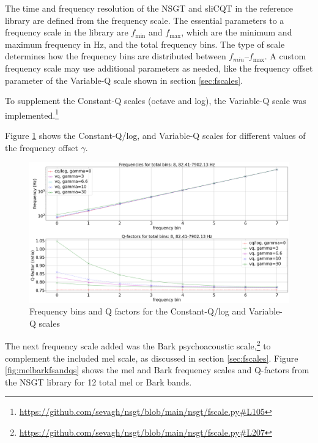 \documentclass[report.tex]{subfiles}
\begin{document}
The time and frequency resolution of the NSGT and sliCQT in the reference library are defined from the frequency scale. The essential parameters to a frequency scale in the library are $f_{\text{min}}$ and $f_{\text{max}}$, which are the minimum and maximum frequency in Hz, and the total frequency bins. The type of scale determines how the frequency bins are distributed between $f_{min}$--$f_{\text{max}}$. A custom frequency scale may use additional parameters as needed, like the frequency offset parameter of the Variable-Q scale shown in section \ref{sec:fscales}.

To supplement the Constant-Q scales (octave and log), the Variable-Q scale was implemented.\footnote{\url{https://github.com/sevagh/nsgt/blob/main/nsgt/fscale.py\#L105}}

Figure \ref{fig:vq} shows the Constant-Q/log, and Variable-Q scales for different values of the frequency offset $\gamma$.

\begin{figure}[ht]
	\centering
	\includegraphics[width=\textwidth]{./images-freqscales/vqlog.png}
	\caption{Frequency bins and Q factors for the Constant-Q/log and Variable-Q scales}
	\label{fig:vq}
\end{figure}

The next frequency scale added was the Bark psychoacoustic scale,\footnote{\url{https://github.com/sevagh/nsgt/blob/main/nsgt/fscale.py\#L207}} to complement the included mel scale, as discussed in section \ref{sec:fscales}. Figure \ref{fig:melbarkfsandqs} shows the mel and Bark frequency scales and Q-factors from the NSGT library for 12 total mel or Bark bands.
\end{document}
